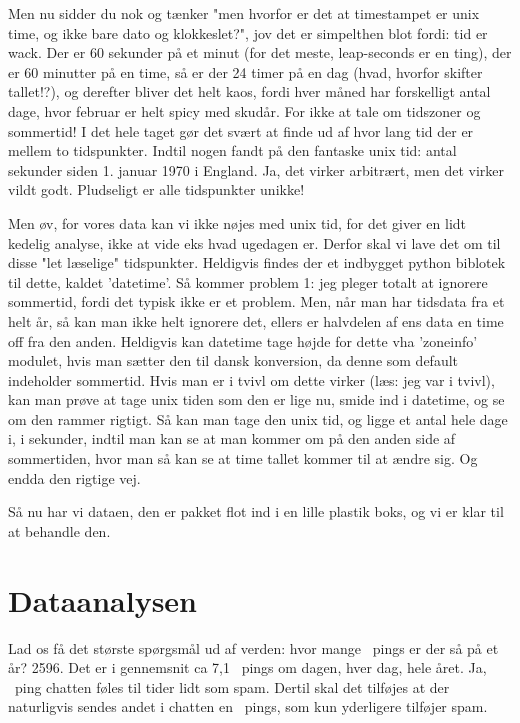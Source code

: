 \documentclass{article}
\newlength\myheight
\newlength\mydepth
\newcommand*\inlinegraphics[1]{%
  \settototalheight\myheight{Xygp}%
  \settodepth\mydepth{Xygp}%
  \raisebox{-\mydepth}{\texttt{[image: \#1]}}%
}
\newcommand{\coffee}[0]{\inlinegraphics{coffee.png}}
\begin{document}
Men nu sidder du nok og tænker "men hvorfor er det at timestampet er unix time, og ikke bare dato og klokkeslet?", jov det er simpelthen blot fordi: tid er wack. Der er 60 sekunder på et minut (for det meste, leap-seconds er en ting), der er 60 minutter på en time, så er der 24 timer på en dag (hvad, hvorfor skifter tallet!?), og derefter bliver det helt kaos, fordi hver måned har forskelligt antal dage, hvor februar er helt spicy med skudår. For ikke at tale om tidszoner og sommertid! I det hele taget gør det svært at finde ud af hvor lang tid der er mellem to tidspunkter. Indtil nogen fandt på den fantaske unix tid: antal sekunder siden 1. januar 1970 i England. Ja, det virker arbitrært, men det virker vildt godt. Pludseligt er alle tidspunkter unikke!

Men øv, for vores data kan vi ikke nøjes med unix tid, for det giver en lidt kedelig analyse, ikke at vide eks hvad ugedagen er. Derfor skal vi lave det om til disse "let læselige" tidspunkter. Heldigvis findes der et indbygget python biblotek til dette, kaldet 'datetime'. Så kommer problem 1: jeg pleger totalt at ignorere sommertid, fordi det typisk ikke er et problem. Men, når man har tidsdata fra et helt år, så kan man ikke helt ignorere det, ellers er halvdelen af ens data en time off fra den anden. Heldigvis kan datetime tage højde for dette vha 'zoneinfo' modulet, hvis man sætter den til dansk konversion, da denne som default indeholder sommertid. Hvis man er i tvivl om dette virker (læs: jeg var i tvivl), kan man prøve at tage unix tiden som den er lige nu, smide ind i datetime, og se om den rammer rigtigt. Så kan man tage den unix tid, og ligge et antal hele dage i, i sekunder, indtil man kan se at man kommer om på den anden side af sommertiden, hvor man så kan se at time tallet kommer til at ændre sig. Og endda den rigtige vej.

Så nu har vi dataen, den er pakket flot ind i en lille plastik boks, og vi er klar til at behandle den.


\section*{Dataanalysen}

Lad os få det største spørgsmål ud af verden: hvor mange \coffee\ pings er der så på et år? 2596. Det er i gennemsnit ca 7,1 \coffee\ pings om dagen, hver dag, hele året. Ja, \coffee\ ping chatten føles til tider lidt som spam. Dertil skal det tilføjes at der naturligvis sendes andet i chatten en \coffee\ pings, som kun yderligere tilføjer spam.
\end{document}
